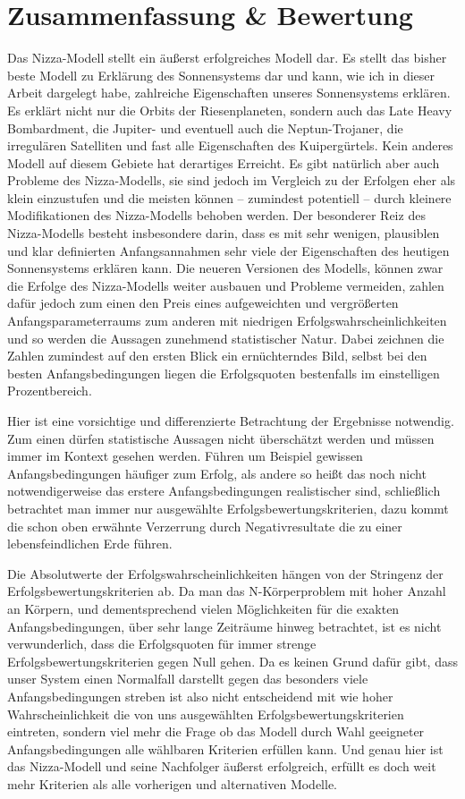 \documentclass[12pt,a4paper,twoside]{article}
\begin{document}
\section{Zusammenfassung \& Bewertung}
Das Nizza-Modell stellt ein äußerst erfolgreiches Modell dar. Es stellt das bisher beste Modell zu Erklärung des Sonnensystems dar und kann, wie ich in dieser Arbeit dargelegt habe, zahlreiche Eigenschaften unseres Sonnensystems erklären.
Es erklärt nicht nur die Orbits der Riesenplaneten, sondern auch das Late Heavy Bombardment, die Jupiter- und eventuell auch die Neptun-Trojaner, die irregulären Satelliten und fast alle Eigenschaften des Kuipergürtels.
Kein anderes Modell auf diesem Gebiete hat derartiges Erreicht.
Es gibt natürlich aber auch Probleme des Nizza-Modells, sie sind jedoch im Vergleich zu der Erfolgen eher als klein einzustufen und die meisten können -- zumindest potentiell -- durch kleinere Modifikationen des Nizza-Modells behoben werden.
Der besonderer Reiz des Nizza-Modells besteht insbesondere darin, dass es mit sehr wenigen, plausiblen und klar definierten Anfangsannahmen sehr viele der Eigenschaften des heutigen Sonnensystems erklären kann.
Die neueren Versionen des Modells, können zwar die Erfolge des Nizza-Modells weiter ausbauen und Probleme vermeiden, zahlen dafür jedoch zum einen den Preis eines aufgeweichten und vergrößerten Anfangsparameterraums zum anderen mit niedrigen Erfolgswahrscheinlichkeiten und so werden die Aussagen zunehmend statistischer Natur. Dabei zeichnen die Zahlen zumindest auf den ersten Blick ein ernüchterndes Bild, selbst bei den besten Anfangsbedingungen liegen die Erfolgsquoten bestenfalls im einstelligen Prozentbereich.

Hier ist eine vorsichtige und differenzierte Betrachtung der Ergebnisse notwendig. Zum einen dürfen statistische Aussagen nicht überschätzt werden und müssen immer im Kontext gesehen werden. Führen um Beispiel gewissen Anfangsbedingungen häufiger zum Erfolg, als andere so heißt das noch nicht notwendigerweise das erstere Anfangsbedingungen realistischer sind, schließlich betrachtet man immer nur ausgewählte Erfolgsbewertungskriterien, dazu kommt die schon oben erwähnte Verzerrung durch Negativresultate die zu einer lebensfeindlichen Erde führen.

Die Absolutwerte der Erfolgswahrscheinlichkeiten hängen von der Stringenz der Erfolgsbewertungskriterien ab. Da man das N-Körperproblem mit hoher Anzahl an Körpern, und dementsprechend vielen Möglichkeiten für die exakten Anfangsbedingungen, über sehr lange Zeiträume hinweg betrachtet, ist es nicht verwunderlich, dass die Erfolgsquoten für immer strenge Erfolgsbewertungskriterien gegen Null gehen.
Da es keinen Grund dafür gibt, dass unser System einen Normalfall darstellt gegen das besonders viele Anfangsbedingungen streben ist also nicht entscheidend mit wie hoher Wahrscheinlichkeit die von uns ausgewählten Erfolgsbewertungskriterien eintreten, sondern viel mehr die Frage ob das Modell durch Wahl geeigneter Anfangsbedingungen alle wählbaren Kriterien erfüllen kann.
Und genau hier ist das Nizza-Modell und seine Nachfolger äußerst erfolgreich, erfüllt es doch weit mehr Kriterien als alle vorherigen und alternativen Modelle.
\end{document}
